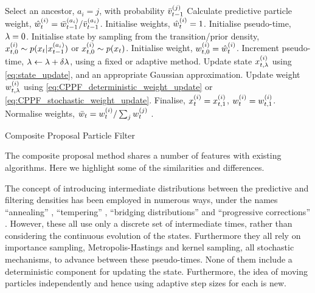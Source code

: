 \documentclass{article}
\begin{document}
\begin{algorithm} \label{alg:general_CPPF}
\begin{algorithmic}[1]
        \STATE Select an ancestor, $a_i=j$, with probability $\bar{v}_{t-1}^{(j)}$
        \STATE Calculate predictive particle weight, $\hat{w}_{t}^{(i)} = \bar{w}_{t-1}^{(a_i)} / \bar{v}_{t-1}^{(a_i)}$.
      \ELSE
        \STATE Initialise weights, $\hat{w}_{t}^{(i)} = 1$.
      \ENDIF
      \STATE Initialise pseudo-time, $\lambda=0$.
      \STATE Initialise state by sampling from the transition/prior density, $x_{t,0}^{(i)} \sim p(x_{t} | x_{t-1}^{(a_{i})})$ or $x_{t,0}^{(i)} \sim p(x_{t})$.
      \STATE Initialise weight, $w_{t,0}^{(i)} = \hat{w}_{t}^{(i)}$.
        \STATE Increment pseudo-time, $\lambda \leftarrow \lambda+\delta\lambda$, using a fixed or adaptive method.
        \STATE Update state $x_{t,\lambda}^{(i)}$ using \eqref{eq:state_update}, and an appropriate Gaussian approximation.
        \STATE Update weight $w_{t,\lambda}^{(i)}$ using \eqref{eq:CPPF_deterministic_weight_update} or \eqref{eq:CPPF_stochastic_weight_update}.
      \ENDWHILE
      \STATE Finalise, $x_{t}^{(i)} = x_{t,1}^{(i)}$, $w_{t}^{(i)} = w_{t,1}^{(i)}$.
    \ENDFOR
    \STATE Normalise weights, $\bar{w}_{t} = w_{t}^{(i)} / \sum_j w_{t}^{(j)}$ .
  \ENDFOR
\end{algorithmic}
\caption{Composite Proposal Particle Filter}
\end{algorithm}

The composite proposal method shares a number of features with existing algorithms. Here we highlight some of the similarities and differences.

The concept of introducing intermediate distributions between the predictive and filtering densities has been employed in numerous ways, under the names ``annealing'' \citep{Neal2001,Deutscher2000,Gall2007}, ``tempering'' \citep{DelMoral2006}, ``bridging distributions'' \citep{Godsill2001b} and ``progressive corrections'' \citep{Oudjane2000}. However, these all use only a discrete set of intermediate times, rather than considering the continuous evolution of the states. Furthermore they all rely on importance sampling, Metropolis-Hastings and kernel sampling, all stochastic mechanisms, to advance between these pseudo-times. None of them include a deterministic component for updating the state. Furthermore, the idea of moving particles independently and hence using adaptive step sizes for each is new.
\end{document}
